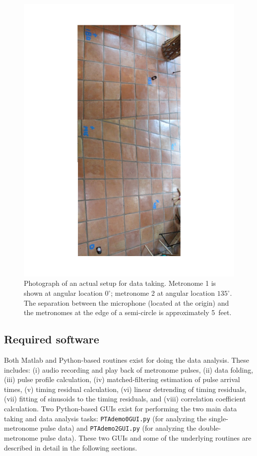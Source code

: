 \documentclass[10pt]{NSF}
\begin{document}
%
\begin{figure}[hbtp!]
\begin{center}
\includegraphics[clip=true, angle=90, width=\textwidth]{figures/actualsetup}
\caption{Photograph of an actual setup for data taking.
Metronome 1 is shown at angular location $0^\circ$; 
metronome 2 at angular location $135^\circ$.
The separation between the microphone (located at the origin) and the
metronomes at the edge of a semi-circle is approximately 5~feet.}
\label{f:actualsetup}
\end{center}
\end{figure}

\subsection{Required software}
\label{s:software}

Both Matlab and Python-based routines exist for doing
the data analysis.
These includes: 
(i) audio recording and play back of metronome pulses, 
(ii) data folding, 
(iii) pulse profile calculation,
(iv) matched-filtering estimation of pulse arrival times, 
(v) timing residual calculation, 
(vi) linear detrending of timing residuals, 
(vii) fitting of sinusoids to the timing residuals, and 
(viii) correlation coefficient calculation.
Two Python-based GUIs exist for performing the two main
data taking and data analysis tasks:  
{\tt PTAdemo0GUI.py} (for 
analyzing the single-metronome pulse data) and
{\tt PTAdemo2GUI.py} 
(for analyzing the double-metronome pulse data).
These two GUIs and some of the underlying routines 
are described in detail in the following sections.
\end{document}
